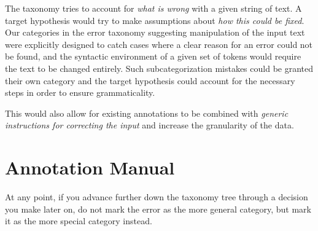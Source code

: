 \documentclass{article}
\begin{document}
The taxonomy tries to account for \textit{what is wrong} with a given string of
text. A target hypothesis would try to make assumptions about \textit{how this
could be fixed}. Our categories in the error taxonomy suggesting manipulation of
the input text were explicitly designed to catch cases where a clear reason for
an error could not be found, and the syntactic environment of a given set of
tokens would require the text to be changed entirely. Such subcategorization
mistakes could be granted their own category and the target hypothesis could
account for the necessary steps in order to ensure grammaticality.

This would also allow for existing annotations to be combined with
\textit{generic instructions for correcting the input} and increase the
granularity of the data.

\appendix

\section{Annotation Manual}
  At any point, if you advance further down the taxonomy tree through a decision
  you make later on, do not mark the error as the more general category, but
  mark it as the more special category instead.
\end{document}
